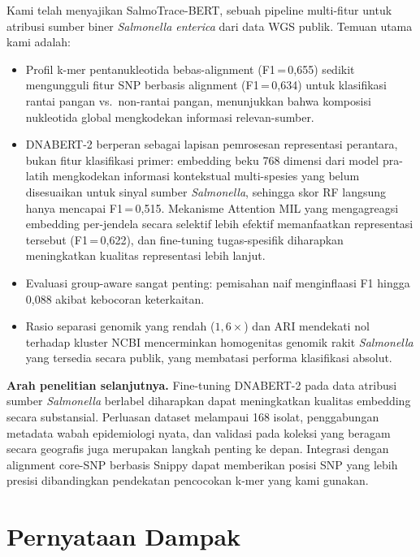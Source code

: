 \documentclass{article}
\begin{document}
Kami telah menyajikan SalmoTrace-BERT, sebuah pipeline multi-fitur untuk
atribusi sumber biner \textit{Salmonella enterica} dari data WGS publik.
Temuan utama kami adalah:

\begin{itemize}
  \item Profil k-mer pentanukleotida bebas-alignment (F1\,=\,0,655) sedikit
        mengungguli fitur SNP berbasis alignment (F1\,=\,0,634) untuk
        klasifikasi rantai pangan vs.\ non-rantai pangan, menunjukkan bahwa
        komposisi nukleotida global mengkodekan informasi relevan-sumber.
  \item DNABERT-2 berperan sebagai lapisan pemrosesan representasi perantara,
        bukan fitur klasifikasi primer: embedding beku 768 dimensi dari model
        pra-latih mengkodekan informasi kontekstual multi-spesies yang belum
        disesuaikan untuk sinyal sumber \textit{Salmonella}, sehingga skor RF
        langsung hanya mencapai F1\,=\,0,515. Mekanisme Attention MIL yang
        mengagreagsi embedding per-jendela secara selektif lebih efektif
        memanfaatkan representasi tersebut (F1\,=\,0,622), dan fine-tuning
        tugas-spesifik diharapkan meningkatkan kualitas representasi lebih lanjut.
  \item Evaluasi group-aware sangat penting: pemisahan naif menginflaasi F1
        hingga 0,088 akibat kebocoran keterkaitan.
  \item Rasio separasi genomik yang rendah ($1{,}6\times$) dan ARI mendekati
        nol terhadap kluster NCBI mencerminkan homogenitas genomik rakit
        \textit{Salmonella} yang tersedia secara publik, yang membatasi
        performa klasifikasi absolut.
\end{itemize}

\textbf{Arah penelitian selanjutnya.}
Fine-tuning DNABERT-2 pada data atribusi sumber \textit{Salmonella} berlabel
diharapkan dapat meningkatkan kualitas embedding secara substansial. Perluasan
dataset melampaui 168 isolat, penggabungan metadata wabah epidemiologi nyata,
dan validasi pada koleksi yang beragam secara geografis juga merupakan langkah
penting ke depan. Integrasi dengan alignment core-SNP berbasis Snippy dapat
memberikan posisi SNP yang lebih presisi dibandingkan pendekatan pencocokan
k-mer yang kami gunakan.

\section*{Pernyataan Dampak}
\end{document}
